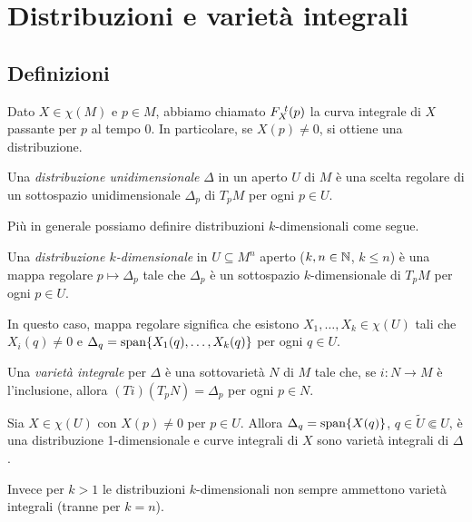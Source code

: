 \chapter{Distribuzioni e varietà integrali}


\section{Definizioni} %

Dato $X\in\chi(M)$ e $p\in M$, abbiamo chiamato $F_{X}^{\ t}(p)$ la curva integrale di $X$ passante per $p$ al tempo $0$. In particolare, se $X(p)\neq 0$, si ottiene una distribuzione.

\begin{definition} 
	Una \emph{distribuzione unidimensionale} $\Delta$ in un aperto $U$ di $M$ è una scelta regolare di un sottospazio unidimensionale $\Delta_p$ di $T_pM$ per ogni $p\in U$.
\end{definition}

Più in generale possiamo definire distribuzioni $k$-dimensionali come segue.

\begin{definition} 
	Una \emph{distribuzione $k$-dimensionale} in $U\subseteq M^n$ aperto ($k,n\in\mathbb N$, $k\le n$) è una mappa regolare  $p\mapsto \Delta_p$ tale che $\Delta_p$ è un sottospazio $k$-dimensionale di $T_pM$ per ogni $p\in U$.
	
	In questo caso, mappa regolare significa che esistono $X_1,\ldots,X_k\in \chi(U)$ tali che $X_i(q)\ne 0$ e $\Delta_q=\mathrm{span}\{X_1(q),\ldots,X_k(q)\}$ per ogni $q\in U$.
\end{definition}

\begin{definition} 
	Una \emph{varietà integrale} per $\Delta$ è una sottovarietà $N$ di $M$ tale che, se $i:N\to M$ è l'inclusione,
	allora $(Ti)(T_pN)=\Delta_p$ per ogni $p\in N$.
\end{definition}

\begin{example}
	Sia $X\in\chi(U)$ con $X(p)\ne 0$ per $p\in U$. Allora $\Delta_q=\mathrm{span} \{X(q)\}$, $q\in\tilde U\Subset U$, è una distribuzione 1-dimensionale e curve integrali di $X$ sono varietà integrali di $\Delta$.
\end{example}

Invece per $k>1$ le distribuzioni $k$-dimensionali non sempre ammettono varietà integrali (tranne per $k=n$).


